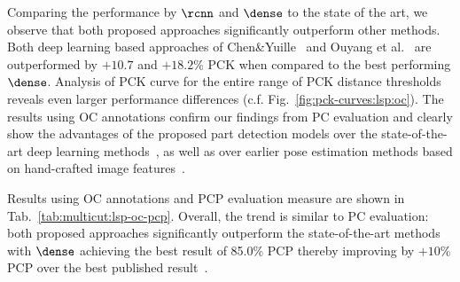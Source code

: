 Comparing the performance by $\rcnn$ and $\dense$ to the state of the
art, we observe that both proposed approaches significantly outperform
other methods. Both deep learning based approaches of
Chen\&Yuille~\cite{chen14nips} and Ouyang et al.~\cite{ouyang14cvpr}
are outperformed by $+10.7$ and $+18.2$\% PCK when compared to the
best performing $\dense$. Analysis of PCK curve for the entire range
of PCK distance thresholds reveals even larger performance differences
(c.f. Fig.~\ref{fig:pck-curves:lsp:oc}). The results using OC
annotations confirm our findings from PC evaluation and clearly show
the advantages of the proposed part detection models over the
state-of-the-art deep learning methods~\cite{chen14nips,ouyang14cvpr},
as well as over earlier pose estimation methods based on hand-crafted
image features~\cite{pishchulin13iccv,kiefel14eccv,ramakrishna14eccv}.



 Results using OC annotations and
PCP evaluation measure are shown in
Tab.~\ref{tab:multicut:lsp-oc-pcp}. Overall, the trend is similar to
PC evaluation: both proposed approaches significantly outperform
the state-of-the-art methods with $\dense$ achieving the best result
of 85.0\% PCP thereby improving by $+10$\% PCP over the best
published result~\cite{chen14nips}.
